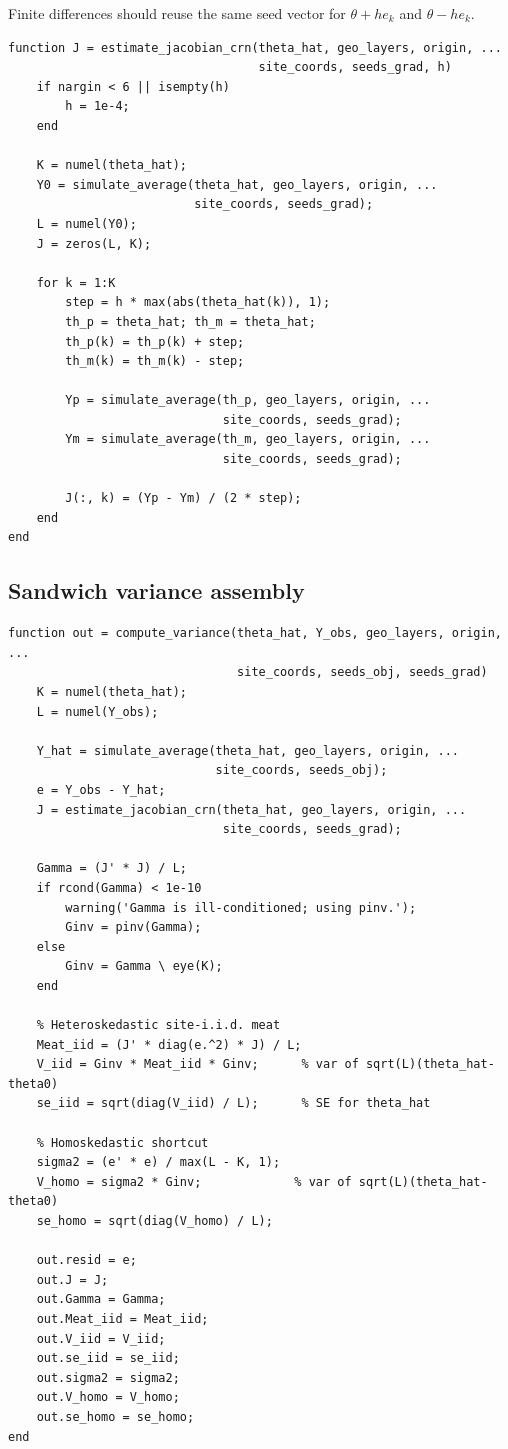 \documentclass[11pt]{article}
\begin{document}
Finite differences should reuse the same seed vector for $\theta+h e_k$ and
$\theta-h e_k$.

\begin{lstlisting}
function J = estimate_jacobian_crn(theta_hat, geo_layers, origin, ...
                                   site_coords, seeds_grad, h)
    if nargin < 6 || isempty(h)
        h = 1e-4;
    end

    K = numel(theta_hat);
    Y0 = simulate_average(theta_hat, geo_layers, origin, ...
                          site_coords, seeds_grad);
    L = numel(Y0);
    J = zeros(L, K);

    for k = 1:K
        step = h * max(abs(theta_hat(k)), 1);
        th_p = theta_hat; th_m = theta_hat;
        th_p(k) = th_p(k) + step;
        th_m(k) = th_m(k) - step;

        Yp = simulate_average(th_p, geo_layers, origin, ...
                              site_coords, seeds_grad);
        Ym = simulate_average(th_m, geo_layers, origin, ...
                              site_coords, seeds_grad);

        J(:, k) = (Yp - Ym) / (2 * step);
    end
end
\end{lstlisting}

\subsection{Sandwich variance assembly}

\begin{lstlisting}
function out = compute_variance(theta_hat, Y_obs, geo_layers, origin, ...
                                site_coords, seeds_obj, seeds_grad)
    K = numel(theta_hat);
    L = numel(Y_obs);

    Y_hat = simulate_average(theta_hat, geo_layers, origin, ...
                             site_coords, seeds_obj);
    e = Y_obs - Y_hat;
    J = estimate_jacobian_crn(theta_hat, geo_layers, origin, ...
                              site_coords, seeds_grad);

    Gamma = (J' * J) / L;
    if rcond(Gamma) < 1e-10
        warning('Gamma is ill-conditioned; using pinv.');
        Ginv = pinv(Gamma);
    else
        Ginv = Gamma \ eye(K);
    end

    % Heteroskedastic site-i.i.d. meat
    Meat_iid = (J' * diag(e.^2) * J) / L;
    V_iid = Ginv * Meat_iid * Ginv;      % var of sqrt(L)(theta_hat-theta0)
    se_iid = sqrt(diag(V_iid) / L);      % SE for theta_hat

    % Homoskedastic shortcut
    sigma2 = (e' * e) / max(L - K, 1);
    V_homo = sigma2 * Ginv;             % var of sqrt(L)(theta_hat-theta0)
    se_homo = sqrt(diag(V_homo) / L);

    out.resid = e;
    out.J = J;
    out.Gamma = Gamma;
    out.Meat_iid = Meat_iid;
    out.V_iid = V_iid;
    out.se_iid = se_iid;
    out.sigma2 = sigma2;
    out.V_homo = V_homo;
    out.se_homo = se_homo;
end
\end{lstlisting}
\end{document}
